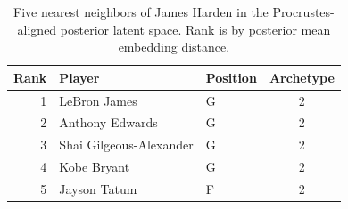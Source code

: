 \begin{table}[htbp]
  \centering\small
  \begin{tabular}{rllc}
    \toprule
    Rank & Player & Position & Archetype \\
    \midrule
    1 & LeBron James & G & 2 \\
    2 & Anthony Edwards & G & 2 \\
    3 & Shai Gilgeous-Alexander & G & 2 \\
    4 & Kobe Bryant & G & 2 \\
    5 & Jayson Tatum & F & 2 \\
    \bottomrule
  \end{tabular}
  \caption{Five nearest neighbors of James Harden in the Procrustes-aligned posterior latent space. Rank is by posterior mean embedding distance.}
  \label{tab:James_Harden_neighbors}
\end{table}

